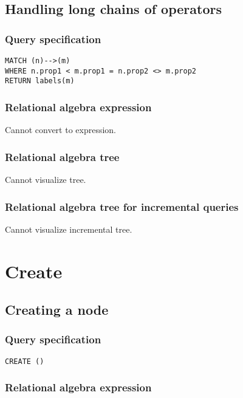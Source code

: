 \subsection{Handling long chains of operators}

\subsubsection*{Query specification}

\begin{lstlisting}
MATCH (n)-->(m)
WHERE n.prop1 < m.prop1 = n.prop2 <> m.prop2
RETURN labels(m)
\end{lstlisting}

\subsubsection*{Relational algebra expression}

Cannot convert to expression.

\subsubsection*{Relational algebra tree}

Cannot visualize tree.

\subsubsection*{Relational algebra tree for incremental queries}

Cannot visualize incremental tree.

\section{Create}

\subsection{Creating a node}

\subsubsection*{Query specification}

\begin{lstlisting}
CREATE ()
\end{lstlisting}

\subsubsection*{Relational algebra expression}

